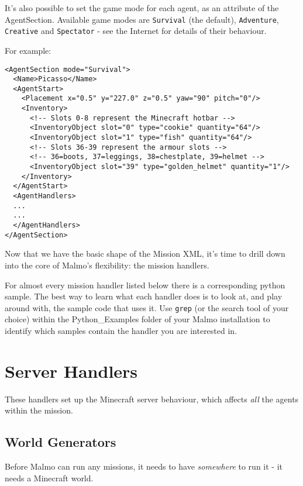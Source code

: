 \documentclass[11pt]{article} %
\begin{document}
It's also possible to set the game mode for each agent, as an attribute of the AgentSection. Available game modes are \lstinline!Survival! (the default), \lstinline!Adventure!, \lstinline!Creative! and \lstinline!Spectator! - see the Internet for details of their behaviour.

For example:

\begin{lstlisting}[frame=lines]
<AgentSection mode="Survival">
  <Name>Picasso</Name>
  <AgentStart>
    <Placement x="0.5" y="227.0" z="0.5" yaw="90" pitch="0"/>
    <Inventory>
      <!-- Slots 0-8 represent the Minecraft hotbar -->
      <InventoryObject slot="0" type="cookie" quantity="64"/>
      <InventoryObject slot="1" type="fish" quantity="64"/>
      <!-- Slots 36-39 represent the armour slots -->
      <!-- 36=boots, 37=leggings, 38=chestplate, 39=helmet -->
      <InventoryObject slot="39" type="golden_helmet" quantity="1"/>
    </Inventory>
  </AgentStart>
  <AgentHandlers>
  ...
  ...
  </AgentHandlers>
</AgentSection>
\end{lstlisting}

Now that we have the basic shape of the Mission XML, it's time to drill down into the core of Malmo's flexibility: the mission handlers.

\begin{mdframed}[style=tipFrame]
For almost every mission handler listed below there is a corresponding python sample. The best way to learn what each handler does is to look at, and play around with, the sample code that uses it. Use \lstinline!grep! (or the search tool of your choice) within the Python\_Examples folder of your Malmo installation to identify which samples contain the handler you are interested in.
\end{mdframed}

\section{Server Handlers}

These handlers set up the Minecraft server behaviour, which affects \emph{all} the agents within the mission.

\subsection{World Generators}

Before Malmo can run any missions, it needs to have \emph{somewhere} to run it - it needs a Minecraft world.
\end{document}
